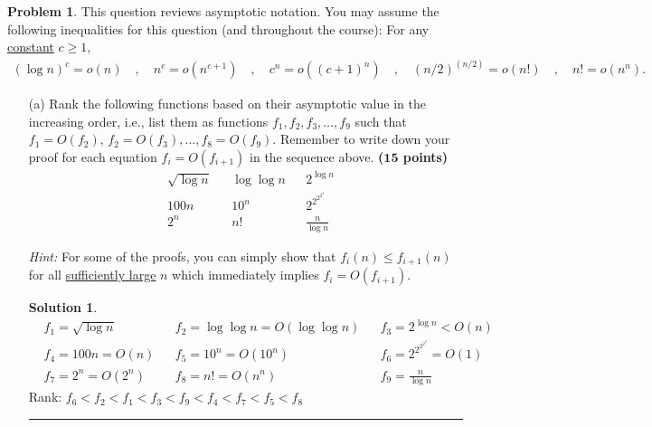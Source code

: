 \documentclass{article}
\theoremstyle{definition}
\newtheorem{problem}{Problem}
\def\fline{\rule{0.75\linewidth}{0.5pt}}
\newcommand{\finishline}{\begin{center}\fline\end{center}}
\newtheorem*{solution*}{Solution}
\newenvironment{solution}{\begin{solution*}}{{\finishline} \end{solution*}}
\newcommand{\grade}[1]{\hfill{\textbf{($\mathbf{#1}$ points)}}}
\begin{document}
\begin{problem}
	This question reviews asymptotic notation. You may assume the following inequalities for this question (and throughout the course): For any \underline{constant} $c \geq 1$, 
	\begin{align*}
		(\log{n})^c = o(n) \quad,\quad n^c = o(n^{c+1}) \quad,\quad c^n = o((c+1)^n) \quad,\quad (n/2)^{(n/2)} = o(n!) \quad,\quad n! = o(n^n). 
	\end{align*}
	\begin{enumerate}
	\item[(a)] Rank the following functions based on their asymptotic value in the increasing order, i.e., list them as functions $f_1,f_2,f_3,\ldots,f_{9}$ such that $f_1 = O(f_2)$, $f_2 = O(f_3), \ldots, f_{8} = O(f_{9})$. Remember to write down your proof
	for each equation $f_i = O(f_{i+1})$ in the sequence above.  \grade{15}
	\begin{align*}
		&\sqrt{\log{n}} &&\log\log{n} &&2^{{\log{n}}}  \\ 
		&100n   &&10^{n} &&2^{2^{2^{2^{2}}}} \\ 
		&2^{n} && n! &&\frac{n}{\log{n}} 
	\end{align*}
	
	\smallskip 
	\emph{Hint:} For some of the proofs, you can simply show that $f_i(n) \leq f_{i+1}(n)$ for all \underline{sufficiently large} $n$ which immediately implies $f_i = O(f_{i+1})$. 
	

\begin{solution}

	\begin{align*} 
		&f_1 = \sqrt{\log{n}} &&f_2 = \log\log{n} = O(\log\log{n}) &&f_3 = 2^{{\log{n}}} < O(n)  \\ 
		&f_4 = 100n =O(n) &&f_5 = 10^{n} = O(10^{n}) &&f_6 = 2^{2^{2^{2^{2}}}} = O(1) \\ 
		&f_7 = 2^{n} = O(2^{n}) &&f_8 = n! = O(n^{n}) &&f_9 = \frac{n}{\log{n}} 
	\end{align*}
	Rank: $f_6 < f_2 < f_1 < f_3 < f_9 < f_4 < f_7 < f_5 < f_8$ \\
	

\end{solution}
\end{enumerate}
\end{problem}
\end{document}
